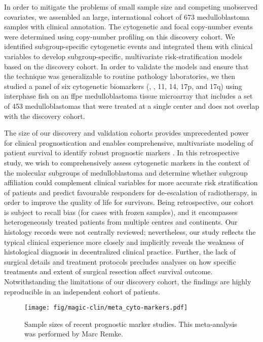 In order to mitigate the problems of small sample size and competing unobserved covariates, we assembled an large, international cohort of 673 medulloblastoma samples with clinical annotation. The cytogenetic and focal copy-number events were determined using copy-number profiling on this discovery cohort. We identified subgroup-specific cytogenetic events and integrated them with clinical variables to develop subgroup-specific, multivariate risk-stratification models based on the discovery cohort. In order to validate the models and ensure that the technique was generalizable to routine pathology laboratories, we then studied a panel of six cytogenetic biomarkers (, , 11, 14, 17p, and 17q) using interphase \gls{fish} on an \gls{ffpe} medulloblastoma tissue microarray that includes a set of 453 medulloblastomas that were treated at a single center and does not overlap with the discovery cohort.

The size of our discovery and validation cohorts provides unprecedented power for clinical prognostication and enables comprehensive, multivariate modeling of patient survival to identify robust prognostic markers . In this retrospective study, we wish to comprehensively assess cytogenetic markers in the context of the molecular subgroups of medulloblastoma and determine whether subgroup affiliation could complement clinical variables for more accurate risk stratification of patients and predict favourable responders for de-escalation of radiotherapy, in order to improve the quality of life for survivors. Being retrospective, our cohort is subject to recall bias (for cases with frozen samples), and it encompasses heterogeneously treated patients from multiple centres and continents. Our histology records were not centrally reviewed; nevertheless, our study reflects the typical clinical experience more closely and implicitly reveals the weakness of histological diagnosis in decentralized clinical practice. Further, the lack of surgical details and treatment protocols precludes analyses on how specific treatments and extent of surgical resection affect survival outcome. Notwithstanding the limitations of our discovery cohort, the findings are highly reproducible in an independent cohort of patients.

\begin{SCfigure}[5][t]
	\texttt{[image: fig/magic-clin/meta\_cyto-markers.pdf]}
	\caption[Sample sizes of recent prognostic marker studies]
	{
	Sample sizes of recent prognostic marker studies.
	This meta-analysis was performed by Marc Remke.
	}
	\label{fig:meta_cyto-markers}
\end{SCfigure}

